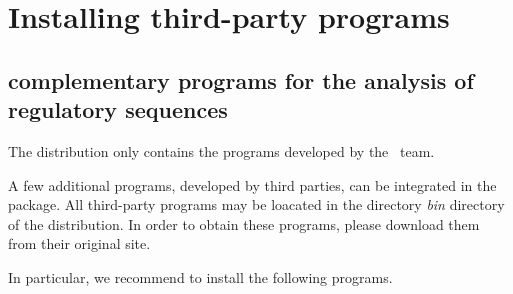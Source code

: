 \documentclass[12pt,a4paper, oneside]{scrreprt} %
\begin{document}












\chapter{Installing third-party programs}

\section{complementary programs for the analysis of regulatory
  sequences}

The \RSAT distribution only contains the programs developed by the
\RSAT \ team. 

A few additional programs, developed by third parties, can be
integrated in the package. All third-party programs may be loacated in
the directory \emph{bin} directory of the \RSAT distribution. In order
to obtain these programs, please download them from their original
site.

In particular, we recommend to install the following programs.
\end{document}
